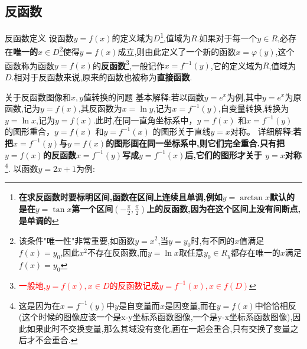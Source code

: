 \documentclass[8pt a4paper, oneside, UTF8]{ctexbook}  %
\begin{document}
\begin{sloppypar}
    \subsection{反函数}
    \begin{defn}{反函数定义}{}
        设函数$y=f(x)$的定义域为$D$\footnote{\textbf{在求反函数时要标明区间,函数在区间上连续且单调,例如$y=\arctan x$默认的是在$y=\tan x$第一个区间$(-\frac{\pi}{2},\frac{\pi}{2})$上的反函数,因为在这个区间上没有间断点,是单调的}},值域为$R$.如果对于每一个$y \in R $,必存在\textbf{唯一的$x \in D$}\footnote{该条件"唯一性"非常重要,如函数$y=x^2$,当$y=y_0$时,有不同的$x$值满足$f(x)=y_0$,因此$x^2$不存在反函数,而$y=\ln x$取任意$y_0 \in R_y$都存在唯一的$x$满足$f(x)=y_0$}\label{xxx1}使得$y=f(x)$成立,则由此定义了一个新的函数$x=\varphi(y)$,这个函数称为函数$y=f(x)$的\textbf{反函数}\footnote{\textcolor{red}{一般地,$y=f(x),x \in D$的反函数记成$y=f^{-1}\left(x\right),x\in f(D)$}},一般记作$x=f^{-1}(y)$,它的定义域为$R$,值域为$D$.相对于反函数来说,原来的函数也被称为\textbf{直接函数}.
    \end{defn}
    \begin{criterion}{关于反函数图像和$x,y$值转换的问题}{}
        基本解释:若以函数$y=e^x$为例,其中$y=e^x$为原函数,记为$y=f(x)$,其反函数为$x=\ln y$,记为$x=f^{-1}(y)$,自变量转换,转换为$y=\ln x$,记为$y=f(x)$.此时,在同一直角坐标系中，$y=f(x)$ 和$x=f^{-1}(y)$ 的图形重合，$y=f(x)$ 和$y=f^{-1}(x)$ 的图形关于直线$y=x$对称。\newline
        详细解释:\textbf{若把$x=f^{-1}(y)$与$y=f(x)$的图形画在同一坐标系中,则它们完全重合.只有把$y=f(x)$的反函数$x=f^{-1}(y)$写成$y=f^{-1}(x)$后,它们的图形才关于 $y=x$对称}\footnote{这是因为在$x=f^{-1}(y)$中$y$是自变量而$x$是因变量,而在$y=f(x)$中恰恰相反(这个时候的图像应该一个是x-y坐标系函数图像,一个是y-x坐标系函数图像),因此如果此时不交换变量,那么其域没有变化,画在一起会重合,只有交换了变量之后才不会重合.}.
        以函数$y=2x+1$为例:
        \begin{center}
\end{center}
\end{criterion}
\end{sloppypar}
\end{document}
